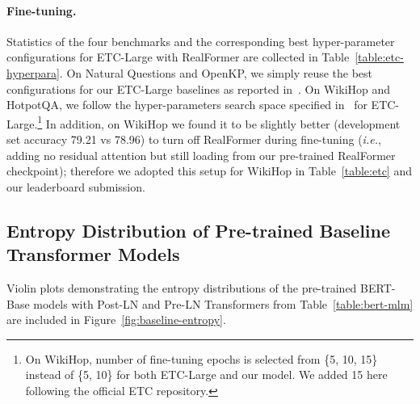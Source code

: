 \documentclass[11pt,a4paper]{article}
\begin{document}
\paragraph{Fine-tuning.} 
Statistics of the four benchmarks and the corresponding best hyper-parameter configurations for ETC-Large with RealFormer are collected in Table~\ref{table:etc-hyperpara}. 
On Natural Questions and OpenKP, we simply reuse the best configurations for our ETC-Large baselines as reported in~\citet{Ainslie-2020-etc}. 
On WikiHop and HotpotQA, we follow the hyper-parameters search space specified in~\citet{Ainslie-2020-etc} for ETC-Large.\footnote{On WikiHop, number of fine-tuning epochs is selected from \{5, 10, 15\} instead of \{5, 10\} for both ETC-Large and our model. We added 15 here following the official ETC repository.} In addition, on WikiHop we found it to be slightly better (development set accuracy 79.21 vs 78.96) to turn off RealFormer during fine-tuning (\emph{i.e.}, adding no residual attention but still loading from our pre-trained RealFormer checkpoint); therefore we adopted this setup for WikiHop in Table~\ref{table:etc} and our leaderboard submission.



\subsection{Entropy Distribution of Pre-trained Baseline Transformer Models} \label{sec:appendix:entropy}

Violin plots demonstrating the entropy distributions of the pre-trained BERT-Base models with Post-LN and Pre-LN Transformers from Table~\ref{table:bert-mlm} are included in Figure~\ref{fig:baseline-entropy}.

\begin{figure*}[!t]
\centering
{}
\caption{Distribution of entropies of the attention probabilities of the tokens of 8,192 held-out examples using the pre-trained BERT-Base with \textbf{Post-LN} and \textbf{Pre-LN} Transformer respectively (see Section~\ref{sec:pre-train}). For better legibility, (1) attention heads in each layer are ordered by their medians of entropies, and (2) distributions are color-coded based on the median of entropies: RED (median $>$ 4.5), YELLOW (1.5 $\le$ median $\le$ 4.5), BLUE (median $<$ 1.5), \emph{i.e.}, colder colors mean sparser attention. Note that here top layers (layer 9-11) tend to have larger entropies compared to RealFormer, which means that attention is relatively \emph{denser}.}
\label{fig:baseline-entropy}
\end{figure*}
\end{document}
